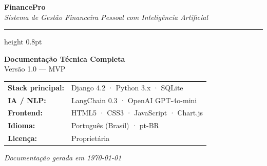 \documentclass[12pt, a4paper, oneside]{report}
\begin{document}

\begin{titlepage}

  \vspace*{1.6cm}

  \begin{center}
    {\fontsize{46}{52}\selectfont\bfseries\color{white}Finance\textcolor{primary}{Pro}}\\[6pt]
    {\large\color{white!70!secondary}\itshape Sistema de Gestão Financeira Pessoal com Inteligência Artificial}
  \end{center}

  \vspace{1cm}

  {\color{white!30!secondary}\hrule height 0.8pt}

  \vspace{2.5cm}

  \begin{center}
    {\LARGE\bfseries\color{gray1} Documentação Técnica Completa}\\[14pt]
    {\large\color{gray3} Versão 1.0 — MVP}\\[28pt]

    \begin{tabular}{ll}
      \textbf{\color{secondary}Stack principal:} & Django 4.2 · Python 3.x · SQLite\\[4pt]
      \textbf{\color{secondary}IA / NLP:}        & LangChain 0.3 · OpenAI GPT-4o-mini\\[4pt]
      \textbf{\color{secondary}Frontend:}        & HTML5 · CSS3 · JavaScript · Chart.js\\[4pt]
      \textbf{\color{secondary}Idioma:}          & Português (Brasil) · pt-BR\\[4pt]
      \textbf{\color{secondary}Licença:}         & Proprietária\\
    \end{tabular}
  \end{center}

  \vfill

  \begin{center}
    {\small\color{gray5}\textit{Documentação gerada em \today}}
  \end{center}
\end{titlepage}
\end{document}

